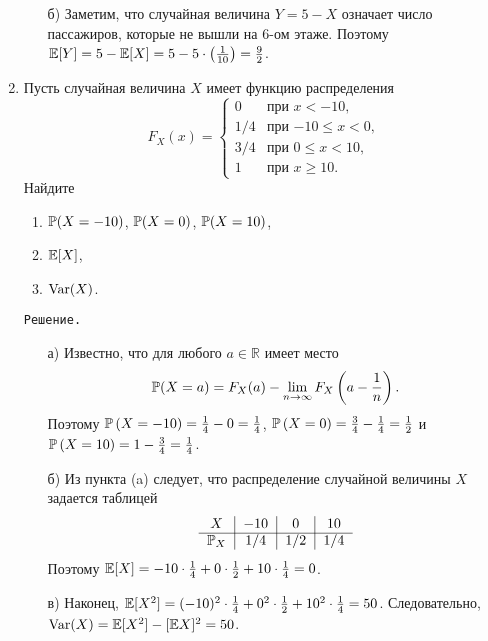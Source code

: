 \begin{enumerate}
\begin{enumerate}
\item[б)] Заметим, что случайная величина $Y = 5 - X$ означает число пассажиров, которые не вышли на 6-ом этаже. Поэтому $\E[Y] = 5 - \E[X] = 5 - 5\cdot\left(\frac{1}{10}\right) = \frac{9}{2}$.
\end{enumerate}
\item Пусть случайная величина $X$ имеет функцию распределения
\[
F_X(x) =          \begin{cases}
                     0     &   \text{при $x < -10$,} \\
                     1/4   &   \text{при $-10 \leq x < 0$,} \\
                     3/4   &   \text{при $0 \leq x < 10$,} \\
                     1     &   \text{при $x \geq 10$.}
                  \end{cases}
\]
Найдите
\begin{enumerate}
  \item $\P(X=-10)$, $\P(X=0)$, $\P(X=10)$,
  \item $\E[X]$,
  \item $\Var(X)$.
\end{enumerate}

\verb"Решение."
\begin{enumerate}
\item[а)] Известно, что для любого $a \in \mathbb{R}$ имеет место
\[
\P(X=a) = F_X(a) - \lim_{n \rightarrow \infty}F_X\left(a-\frac{1}{n}\right) \text{.}
\]
Поэтому $\P\left(X=-10\right) = \frac{1}{4} - 0 = \frac{1}{4}$, $\P\left(X=0\right) = \frac{3}{4} - \frac{1}{4} = \frac{1}{2}$ и $\P\left(X=10\right) = 1 - \frac{3}{4} = \frac{1}{4}$.

\item[б)] Из пункта (a) следует, что распределение случайной величины $X$ задается таблицей
\[
\begin{tabular}{c|c|c|c}
  $X$             & $-10$   & $0$     & $10$ \\ \cline{1-4}
  $\P_X$  & $1/4$   & $1/2$   & $1/4$ \\
\end{tabular}
\]
Поэтому $\E[X] = -10 \cdot \frac{1}{4} + 0 \cdot \frac{1}{2} + 10 \cdot \frac{1}{4} = 0$.

\item[в)] Наконец, $\E[X^2] = (-10)^2 \cdot \frac{1}{4} + 0^2 \cdot \frac{1}{2} + 10^2 \cdot \frac{1}{4} = 50$. Следовательно, $\Var(X) = \E[X^2] - [\E X]^2 = 50$.
\end{enumerate}



\end{enumerate}
